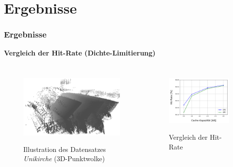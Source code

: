 \documentclass[presentation]{beamer}
\begin{document}
\section{Ergebnisse}
\begin{frame}
	\frametitle{Ergebnisse}
	\baselineskip
	\color{dd-gray} \textbf{Vergleich der Hit-Rate (Dichte-Limitierung)} \color{black}

	\begin{columns}[T] %
		\begin{figure}
			\centering
			\begin{center}
				\caption{Illustration des Datensatzes \emph{Unikirche} (3D-Punktwolke)}
			\end{center}
			\includegraphics[width=1\linewidth]{figures/Unikirche2.png}
			\label{fig:sub6}
		\end{figure}
		\begin{figure}
			\centering
			\begin{center}
				\caption{Vergleich der Hit-Rate}
			\end{center}
			\includegraphics[width=0.7\linewidth]{figures/results/DensityLimitationHitRatesAlternative.png}
			\label{fig:sub7}
		\end{figure}
	\end{columns}


\end{frame}
\end{document}
